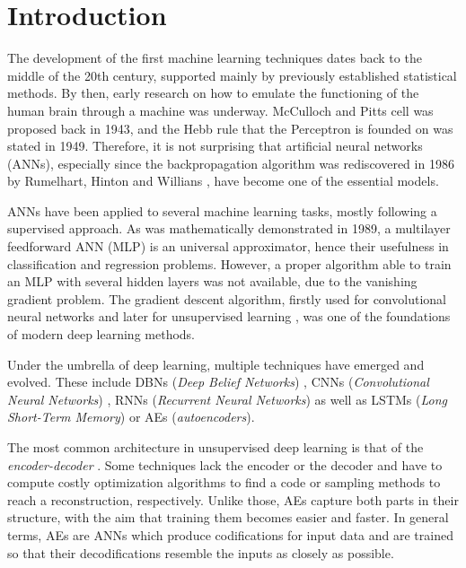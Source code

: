\section{Introduction}
The development of the first machine learning techniques dates back to the middle of the 20th century, supported mainly by previously established statistical methods. By then, early research on how to emulate the functioning of the human brain through a machine was underway. McCulloch and Pitts cell  was proposed back in 1943, and the Hebb rule  that the Perceptron  is founded on was stated in 1949. Therefore, it is not surprising that artificial neural networks (ANNs), especially since the backpropagation algorithm was rediscovered in 1986 by Rumelhart, Hinton and Willians , have become one of the essential models. 

ANNs have been applied to several machine learning tasks, mostly following a supervised approach. As was mathematically demonstrated  in 1989, a multilayer feedforward ANN (MLP) is an universal approximator, hence their usefulness in classification and regression problems. However, a proper algorithm able to train an MLP with several hidden layers was not available, due to the vanishing gradient  problem. The gradient descent algorithm, firstly used for convolutional neural networks  and later for unsupervised learning , was one of the foundations of modern deep learning  methods.

Under the umbrella of deep learning, multiple techniques have emerged and evolved. These include DBNs (\textit{Deep Belief Networks}) , CNNs (\textit{Convolutional Neural Networks}) , RNNs (\textit{Recurrent Neural Networks})  as well as LSTMs (\textit{Long Short-Term Memory})  or AEs (\textit{autoencoders}).

The most common architecture in unsupervised deep learning is that of the \textit{encoder-decoder} . Some techniques lack the encoder or the decoder and have to compute costly optimization algorithms to find a code or sampling methods to reach a reconstruction, respectively. Unlike those, AEs capture both parts in their structure, with the aim that training them becomes easier and faster. In general terms, AEs are ANNs which produce codifications for input data and are trained so that their decodifications resemble the inputs as closely as possible.

